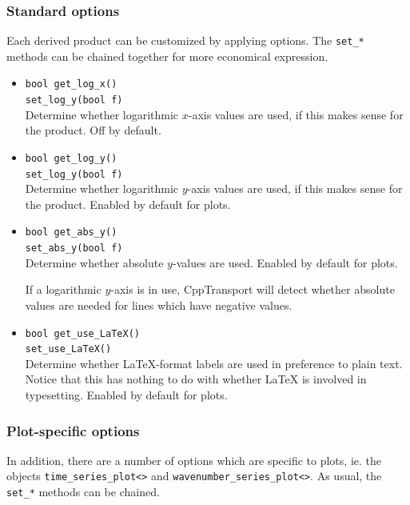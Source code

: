 \documentclass[11pt,a4paper]{article}
\newcommand{\packagefont}{\sffamily}
\newcommand{\CppTransport}{{\packagefont CppTransport}}
\begin{document}
\subsubsection{Standard options}
\label{sec:product-standard-options}
Each derived product can be customized by applying options.
The \texttt{set_*} methods can be chained together for more
economical expression.
\begin{itemize}
	\item \texttt{bool get_log_x()} \\
	\texttt{set_log_y(bool f)} \\
	Determine whether logarithmic $x$-axis values are used, if this makes sense
	for the product. Off by default.
	
	\item \texttt{bool get_log_y()} \\
	\texttt{set_log_y(bool f)} \\
	Determine whether logarithmic $y$-axis values are used, if this makes sense
	for the product. Enabled by default for plots.
	
	\item \texttt{bool get_abs_y()} \\
	\texttt{set_abs_y(bool f)} \\
	Determine whether absolute $y$-values are used. Enabled by default for plots.
	
	If a logarithmic $y$-axis is in use, {\CppTransport} will detect whether
	absolute values are needed for lines which have negative values.
	
	\item \texttt{bool get_use_LaTeX()} \\
	\texttt{set_use_LaTeX()} \\
	\label{method:use_LaTeX}
	Determine whether {\LaTeX}-format labels are used
	in preference to plain text.
	Notice that this has nothing to do with whether {\LaTeX}
	is involved in typesetting. Enabled by default for plots.
\end{itemize}

\subsubsection{Plot-specific options}
\label{sec:plot-options}
In addition, there are a number of options which are specific to plots,
ie. the objects
\texttt{time_series_plot<>}
and
\texttt{wavenumber_series_plot<>}.
As usual, the \texttt{set_*} methods can be chained.
\end{document}
